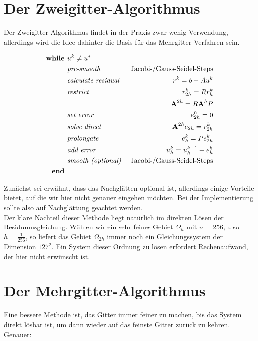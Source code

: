 \section{Der Zweigitter-Algorithmus}\label{s.Der Zweigitter-Algorithmus}

Der Zweigitter-Algorithmus findet in der Praxis zwar wenig Verwendung, allerdings wird die Idee dahinter die Basis für das Mehrgitter-Verfahren sein.

\begin{eqnarray}
\textbf{while } 				&u^{k} \ne u^{*} \notag \\
&\textit{pre-smooth } 			&\textnormal{Jacobi-/Gauss-Seidel-Steps} \notag \\
&\textit{calculate residual }	&r^{k} = b - Au^{k} \notag \\
&\textit{restrict } 			&r^{k}_{2h}=Rr^{k}_{h} \notag \\
&								&{\textbf{A}}^{2h} = R{\textbf{A}}^{h}P \notag \\
&\textit{set error }			&e^{0}_{2h} = 0 \notag \\
&\textit{solve direct }			&{\textbf{A}}^{2h} e_{2h} = r^{k}_{2h} \notag \\
&\textit{prolongate }			&e^{k}_{h} = Pe^{k}_{2h} \notag \\
&\textit{add error }			&u^{k}_{h} = u^{k-1}_{h} + e^{k}_{h} \notag \\
&\textit{smooth (optional) }	&\textnormal{Jacobi-/Gauss-Seidel-Steps} \notag \\
\textbf{end } \notag
\end{eqnarray}

Zunächst sei erwähnt, dass das Nachglätten optional ist, allerdings einige Vorteile bietet, auf die wir hier nicht genauer eingehen möchten. Bei der Implementierung sollte also auf Nachglättung geachtet werden. \\
Der klare Nachteil dieser Methode liegt natürlich im direkten Lösen der Residuumsgleichung. Wählen wir ein sehr feines Gebiet $\Omega_{h}$ mit $n = 256$, also $h = \frac {1} {256}$, so liefert das Gebiet $\Omega_{2h}$ immer noch ein Gleichungssystem der Dimension $127^{2}$. Ein System dieser Ordnung zu lösen erfordert Rechenaufwand, der hier nicht erwünscht ist. \\

\section{Der Mehrgitter-Algorithmus}

Eine bessere Methode ist, das Gitter immer feiner zu machen, bis das System direkt lösbar ist, um dann wieder auf das feinste Gitter zurück zu kehren. Genauer:


